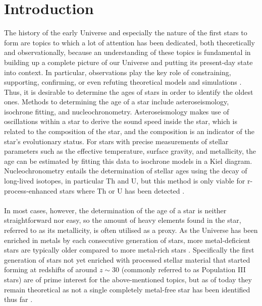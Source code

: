 \documentclass[a4paper,11pt]{article}
\begin{document}
\section{Introduction} \label{introduction}
The history of the early Universe and especially the nature of the first stars to form are topics to which a lot of attention has been dedicated, both theoretically and observationally, because an understanding of these topics is fundamental in building up a complete picture of our Universe and putting its present-day state into context. In particular, observations play the key role of constraining, supporting, confirming, or even refuting theoretical models and simulations \citep[see, e.g.,][]{frebel13,bromm04,klessen23}. Thus, it is desirable to determine the ages of stars in order to identify the oldest ones. Methods to determining the age of a star include asteroseismology, isochrone fitting, and nucleochronometry. Asteroseismology makes use of oscillations within a star to derive the sound speed inside the star, which is related to the composition of the star, and the composition is an indicator of the star's evolutionary status. For stars with precise measurements of stellar parameters such as the effective temperature, surface gravity, and metallicity, the age can be estimated by fitting this data to isochrone models in a Kiel diagram. Nucleochronometry entails the determination of stellar ages using the decay of long-lived isotopes, in particular Th and U, but this method is only viable for r-process-enhanced stars where Th or U has been detected \citep{soderblom10}.\\ \\
%
In most cases, however, the determination of the age of a star is neither straightforward nor easy, so the amount of heavy elements found in the star, referred to as its metallicity, is often utilised as a proxy. As the Universe has been enriched in metals by each consecutive generation of stars, more metal-deficient stars are typically older compared to more metal-rich stars \citep[see, e.g.,][]{frebel15}. Specifically the first generation of stars not yet enriched with processed stellar material that started forming at redshifts of around $z\sim30$ (commonly referred to as Population III stars) are of prime interest for the above-mentioned topics, but as of today they remain theoretical as not a single completely metal-free star has been identified thus far \citep{klessen23}.\\ \\
%
\end{document}
